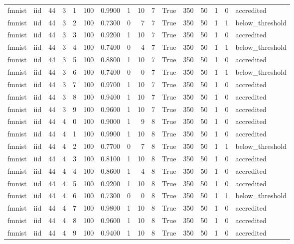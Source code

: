 \begin{tabular}{llrrrrrrrrrrrrrl}
fmnist & iid & 44 & 3 & 1 & 100 & 0.9900 & 1 & 10 & 7 & True & 350 & 50 & 1 & 0 & accredited \\
fmnist & iid & 44 & 3 & 2 & 100 & 0.7300 & 0 & 7 & 7 & True & 350 & 50 & 1 & 1 & below\_threshold \\
fmnist & iid & 44 & 3 & 3 & 100 & 0.9200 & 1 & 10 & 7 & True & 350 & 50 & 1 & 0 & accredited \\
fmnist & iid & 44 & 3 & 4 & 100 & 0.7400 & 0 & 4 & 7 & True & 350 & 50 & 1 & 1 & below\_threshold \\
fmnist & iid & 44 & 3 & 5 & 100 & 0.8800 & 1 & 10 & 7 & True & 350 & 50 & 1 & 0 & accredited \\
fmnist & iid & 44 & 3 & 6 & 100 & 0.7400 & 0 & 0 & 7 & True & 350 & 50 & 1 & 1 & below\_threshold \\
fmnist & iid & 44 & 3 & 7 & 100 & 0.9700 & 1 & 10 & 7 & True & 350 & 50 & 1 & 0 & accredited \\
fmnist & iid & 44 & 3 & 8 & 100 & 0.9400 & 1 & 10 & 7 & True & 350 & 50 & 1 & 0 & accredited \\
fmnist & iid & 44 & 3 & 9 & 100 & 0.9600 & 1 & 10 & 7 & True & 350 & 50 & 1 & 0 & accredited \\
fmnist & iid & 44 & 4 & 0 & 100 & 0.9000 & 1 & 9 & 8 & True & 350 & 50 & 1 & 0 & accredited \\
fmnist & iid & 44 & 4 & 1 & 100 & 0.9900 & 1 & 10 & 8 & True & 350 & 50 & 1 & 0 & accredited \\
fmnist & iid & 44 & 4 & 2 & 100 & 0.7700 & 0 & 7 & 8 & True & 350 & 50 & 1 & 1 & below\_threshold \\
fmnist & iid & 44 & 4 & 3 & 100 & 0.8100 & 1 & 10 & 8 & True & 350 & 50 & 1 & 0 & accredited \\
fmnist & iid & 44 & 4 & 4 & 100 & 0.8600 & 1 & 4 & 8 & True & 350 & 50 & 1 & 0 & accredited \\
fmnist & iid & 44 & 4 & 5 & 100 & 0.9200 & 1 & 10 & 8 & True & 350 & 50 & 1 & 0 & accredited \\
fmnist & iid & 44 & 4 & 6 & 100 & 0.7300 & 0 & 0 & 8 & True & 350 & 50 & 1 & 1 & below\_threshold \\
fmnist & iid & 44 & 4 & 7 & 100 & 0.9800 & 1 & 10 & 8 & True & 350 & 50 & 1 & 0 & accredited \\
fmnist & iid & 44 & 4 & 8 & 100 & 0.9600 & 1 & 10 & 8 & True & 350 & 50 & 1 & 0 & accredited \\
fmnist & iid & 44 & 4 & 9 & 100 & 0.9400 & 1 & 10 & 8 & True & 350 & 50 & 1 & 0 & accredited \\

\end{tabular}

